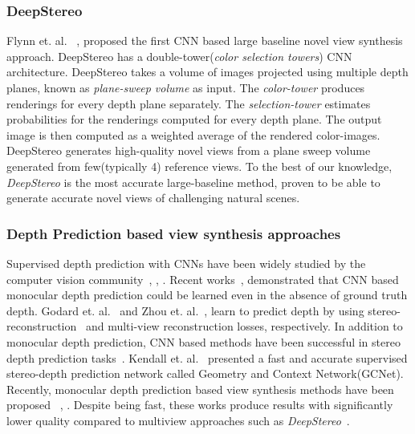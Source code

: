 \documentclass[runningheads]{llncs}
\begin{document}
\subsubsection*{DeepStereo} Flynn et. al. ~\cite{flynn2015deepstereo}, proposed the first CNN based large baseline novel view synthesis approach. DeepStereo has a double-tower(\textit{color  selection towers}) CNN architecture. DeepStereo takes a volume of images projected using multiple depth planes, known as \textit{plane-sweep volume} as input. The \textit{color-tower} produces renderings for every depth plane separately. The \textit{selection-tower} estimates probabilities for the renderings computed for every depth plane. The output image is then computed as a weighted average of the rendered color-images. DeepStereo generates high-quality novel views from a plane sweep volume generated from few(typically 4) reference views. To the best of our knowledge, \textit{DeepStereo} is the most accurate large-baseline method, proven to be able to generate accurate novel views of challenging natural scenes.
\newline
\subsubsection*{Depth Prediction based view synthesis approaches} Supervised depth prediction with CNNs have been widely studied by the computer vision community~\cite{eigen}, \cite{zbontar2016stereo}, \cite{laina2016deeper}.  Recent works~\cite{godard},\cite{zhou2017} demonstrated that CNN based monocular depth prediction could be learned even in the absence of ground truth depth. Godard et. al.~\cite{godard} and Zhou et. al.~\cite{zhou2017}, learn to predict depth by using stereo-reconstruction~\cite{godard} and multi-view reconstruction losses, respectively. In addition to monocular depth prediction, CNN based methods have been successful in stereo depth prediction tasks~\cite{gcnet}. Kendall et. al.~\cite{gcnet} presented a fast and accurate supervised stereo-depth prediction network called Geometry and Context Network(GCNet). Recently, monocular depth prediction based view synthesis methods have been proposed ~\cite{mono1}, \cite{mono2}. Despite being fast, these works produce results with significantly lower quality compared to multiview approaches such as \textit{DeepStereo}~\cite{flynn2015deepstereo}.
\newline
\end{document}
